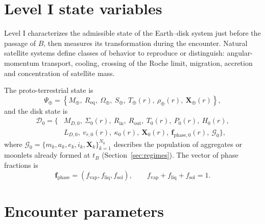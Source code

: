 \documentclass[11pt,a4paper,openany]{report}
\newcommand{\Mt}{M_{\oplus}}
\newcommand{\Req}{R_{\mathrm{eq}}}
\begin{document}
\section{Level I state variables}

Level I characterizes the admissible state of the Earth--disk system just before the passage of
$B$, then measures its transformation during the encounter. Natural satellite systems define
classes of behavior to reproduce or distinguish: angular-momentum transport, cooling, crossing of
the Roche limit, migration, accretion and concentration of satellite mass.

The proto-terrestrial state is
\begin{equation}
\Psi_\oplus=\left\{\Mt,\ \Req,\ \Omega_\oplus,\ S_\oplus,\ T_\oplus(r),\ \rho_\oplus(r),\
\mathbf{X}_\oplus(r)\right\},
\label{eq:Psiterre}
\end{equation}
and the disk state is
\begin{equation}
\begin{aligned}
\mathcal{D}_0=\Big\{&M_{D,0},\ \Sigma_0(r),\ R_{\mathrm{in}},\ R_{\mathrm{out}},\ T_0(r),\
P_0(r),\ H_0(r),\\
&L_{D,0},\ v_{r,0}(r),\ \kappa_0(r),\ \mathbf{X}_0(r),\
\mathbf{f}_{\mathrm{phase},0}(r),\ \mathcal{G}_0\Big\},
\end{aligned}
\label{eq:D0}
\end{equation}
where $\mathcal{G}_0=\{m_k,a_k,e_k,i_k,\mathbf{X}_k\}_{k=1}^{N_0}$ describes the population of
aggregates or moonlets already formed at $t_B$ (Section~\ref{sec:regimes}). The vector of phase
fractions is
\begin{equation}
\mathbf{f}_{\mathrm{phase}}=(f_{\mathrm{vap}},f_{\mathrm{liq}},f_{\mathrm{sol}}),\qquad
f_{\mathrm{vap}}+f_{\mathrm{liq}}+f_{\mathrm{sol}}=1.
\label{eq:fphase}
\end{equation}

\section{Encounter parameters}
\end{document}
